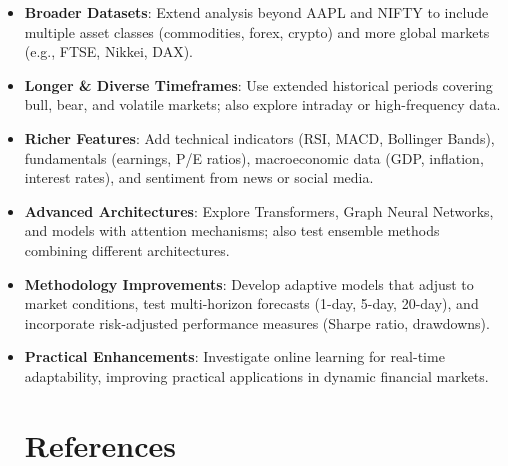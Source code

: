 \documentclass[12pt,a4paper]{report}
\begin{document}
\begin{itemize}
\section{8.4 Future Work}
  \item \textbf{Broader Datasets}: Extend analysis beyond AAPL and NIFTY to include multiple asset classes (commodities, forex, crypto) and more global markets (e.g., FTSE, Nikkei, DAX).
  \item \textbf{Longer \& Diverse Timeframes}: Use extended historical periods covering bull, bear, and volatile markets; also explore intraday or high-frequency data.
  \item \textbf{Richer Features}: Add technical indicators (RSI, MACD, Bollinger Bands), fundamentals (earnings, P/E ratios), macroeconomic data (GDP, inflation, interest rates), and sentiment from news or social media.
  \item \textbf{Advanced Architectures}: Explore Transformers, Graph Neural Networks, and models with attention mechanisms; also test ensemble methods combining different architectures.
  \item \textbf{Methodology Improvements}: Develop adaptive models that adjust to market conditions, test multi-horizon forecasts (1-day, 5-day, 20-day), and incorporate risk-adjusted performance measures (Sharpe ratio, drawdowns).
  \item \textbf{Practical Enhancements}: Investigate online learning for real-time adaptability, improving practical applications in dynamic financial markets.
\chapter{References}
\end{itemize}
\end{document}
